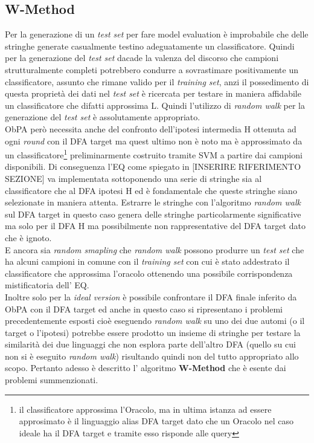 \subsection{W-Method}
\label{sub:wme}
Per la generazione di un \textit{test set} per fare model evaluation  è improbabile che delle stringhe generate casualmente testino adeguatamente un classificatore. Quindi per la generazione del \textit{test set} dacade la valenza del discorso che campioni strutturalmente completi potrebbero condurre a sovrastimare positivamente un classificatore, assunto che rimane valido per il \textit{training set}, anzi il possedimento di questa proprietà dei dati nel \textit{test set} è ricercata per testare in maniera affidabile un classificatore che difatti approssima \ac{L}. Quindi l'utilizzo di \textit{random walk} per la generazione del \textit{test set} è assolutamente appropriato. \\   \ac{ObPA} però necessita anche del confronto dell'ipotesi intermedia \ac{H} ottenuta ad ogni \textit{round} con il \ac{DFA} target ma quest ultimo non è noto ma è approssimato da un classificatore\footnote{il classificatore approssima l'Oracolo, ma in ultima istanza ad essere approsimato è il linguaggio alias \ac{DFA} target dato che un Oracolo nel caso ideale ha il \ac{DFA} target e tramite esso risponde alle query} preliminarmente costruito tramite \ac{SVM} a partire dai campioni disponibili.   Di conseguenza l'\ac{EQ} come spiegato in [INSERIRE RIFERIMENTO SEZIONE] va implementata sottoponendo  una serie di stringhe sia al classificatore che al \ac{DFA} ipotesi \ac{H} ed è fondamentale che queste stringhe siano selezionate in maniera attenta. Estrarre le stringhe con l'algoritmo \textit{random walk} sul \ac{DFA} target in questo caso genera delle stringhe particolarmente significative ma solo per il \ac{DFA} \ac{H} ma possibilmente non rappresentative del \ac{DFA} target dato che è ignoto.\\
 E ancora sia  \textit{random smapling} che \textit{random walk} possono produrre un \textit{test set} che ha alcuni campioni in comune con il \textit{training set} con cui è stato addestrato il classificatore che approssima l'oracolo ottenendo una possibile corrispondenza mistificatoria dell' \ac{EQ}.\\
 Inoltre solo per la \textit{ideal version} è possibile confrontare il \ac{DFA} finale inferito da \ac{ObPA} con il \ac{DFA} target ed anche in questo caso si ripresentano i problemi precedentemente esposti cioè eseguendo \textit{random walk} su uno dei due automi (o il target o l'ipotesi) potrebbe essere prodotto un insieme di stringhe per testare la similarità dei due linguaggi che non esplora parte dell'altro \ac{DFA} (quello su cui non si è eseguito \textit{random walk}) risultando quindi non del tutto appropriato allo scopo. Pertanto adesso è descritto l' algoritmo \textbf{W-Method} \cite{Chow78} che è esente dai problemi summenzionati.

